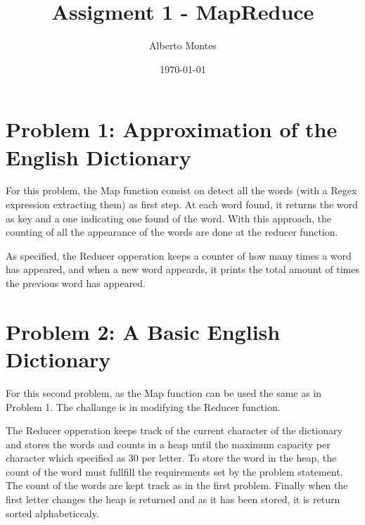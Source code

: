 \documentclass{ethz_report}
\title{Assigment 1 - MapReduce}
\author{Alberto Montes}
\date{\today}
\begin{document}
\maketitle

\section{Problem 1: Approximation of the English Dictionary}

For this problem, the Map function consist on detect all the words (with a Regex expression
extracting them) as first step. At each word found, it returns the word as key and a one
indicating one found of the word. With this approach, the counting of all the appearance of the
words are done at the reducer function.



As specified, the Reducer opperation keeps a counter of how many times a word has appeared, and when
a new word appeards, it prints the total amount of times the previous word has appeared.




\section{Problem 2: A Basic English Dictionary}

For this second problem, as the Map function can be used the same as in Problem 1. The challange is
in modifying the Reducer function.



The Reducer opperation keeps track of the current character of the dictionary and stores the
words and counts in a heap until the maximum capacity per character which specified as 30 per
letter. To store the word in the heap, the count of the word must fullfill the requirements set by
the problem statement.
The count of the words are kept track as in the first problem. Finally when the first letter changes
the heap is returned and as it has been stored, it is return sorted alphabeticcaly.


\end{document}
